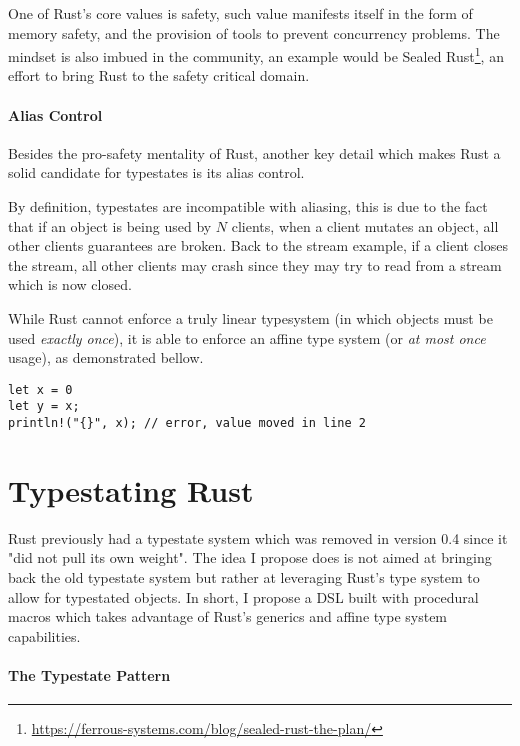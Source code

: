 \documentclass{article}
\begin{document}
One of Rust's core values is safety,
such value manifests itself in the form of memory safety,
and the provision of tools to prevent concurrency problems.
The mindset is also imbued in the community,
an example would be Sealed Rust\footnote{\url{https://ferrous-systems.com/blog/sealed-rust-the-plan/}},
an effort to bring Rust to the safety critical domain.

\paragraph{Alias Control}

Besides the pro-safety mentality of Rust,
another key detail which makes Rust a solid candidate for typestates is its alias control.

By definition, typestates are incompatible with aliasing,
this is due to the fact that if an object is being used by $N$ clients,
when a client mutates an object, all other clients guarantees are broken.
Back to the stream example, if a client closes the stream,
all other clients may crash since they may try to read from a stream which is now closed.

While Rust cannot enforce a truly linear typesystem (in which objects must be used \emph{exactly once}),
it is able to enforce an affine type system (or \emph{at most once} usage), as demonstrated bellow.


\begin{verbatim}
let x = 0
let y = x;
println!("{}", x); // error, value moved in line 2
\end{verbatim}

\section*{Typestating Rust}

Rust previously had a typestate system which was removed in version 0.4 since it "did not pull its own weight".
The idea I propose does is not aimed at bringing back the old typestate system but rather at leveraging Rust's type system to allow for typestated objects.
In short, I propose a DSL built with procedural macros which takes advantage of Rust's generics and affine type system capabilities.

\paragraph{The Typestate Pattern}
\end{document}
